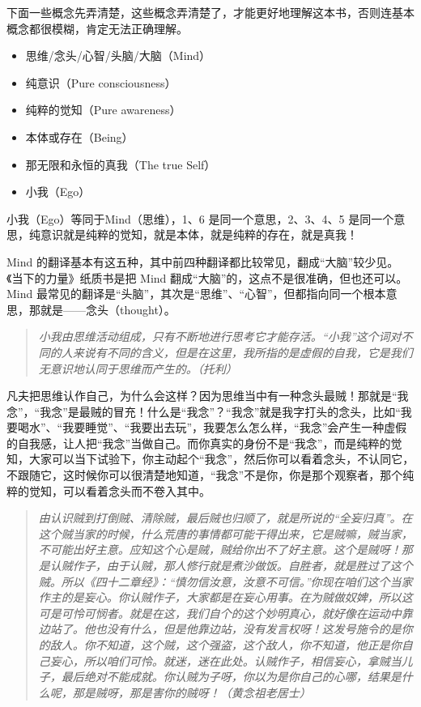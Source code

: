 下面一些概念先弄清楚，这些概念弄清楚了，才能更好地理解这本书，否则连基本概念都很模糊，肯定无法正确理解。

\begin{multicols}{2}
    \begin{itemize}
        \item 思维/念头/心智/头脑/大脑（Mind）
        \item 纯意识（Pure consciousness）
        \item 纯粹的觉知（Pure awareness）
        \item 本体或存在（Being）
        \item 那无限和永恒的真我（The true Self）
        \item 小我（Ego）
    \end{itemize}
\end{multicols}

小我（Ego）等同于Mind（思维），1、6 是同一个意思，2、3、4、5 是同一个意思，纯意识就是纯粹的觉知，就是本体，就是纯粹的存在，就是真我！

Mind 的翻译基本有这五种，其中前四种翻译都比较常见，翻成“大脑”较少见。《当下的力量》纸质书是把 Mind 翻成“大脑”的，这点不是很准确，但也还可以。Mind 最常见的翻译是“头脑”，其次是“思维”、“心智”，但都指向同一个根本意思，那就是——念头（thought）。

\begin{quote}\it
    小我由思维活动组成，只有不断地进行思考它才能存活。“小我”这个词对不同的人来说有不同的含义，但是在这里，我所指的是虚假的自我，它是我们无意识地认同于思维而产生的。（托利）
\end{quote}

凡夫把思维认作自己，为什么会这样？因为思维当中有一种念头最贼！那就是“我念”，“我念”是最贼的冒充！什么是“我念”？“我念”就是我字打头的念头，比如“我要喝水”、“我要睡觉”、“我要出去玩”，我要怎么怎么样，“我念”会产生一种虚假的自我感，让人把“我念”当做自己。而你真实的身份不是“我念”，而是纯粹的觉知，大家可以当下试验下，你主动起个“我念”，然后你可以看着念头，不认同它，不跟随它，这时候你可以很清楚地知道，“我念”不是你，你是那个观察者，那个纯粹的觉知，可以看着念头而不卷入其中。

\begin{quote}\it
    由认识贼到打倒贼、清除贼，最后贼也归顺了，就是所说的“全妄归真”。在这个贼当家的时候，什么荒唐的事情都可能干得出来，它是贼嘛，贼当家，不可能出好主意。应知这个心是贼，贼给你出不了好主意。这个是贼呀！那是认贼作子，由于认贼，那人修行就是煮沙做饭。自胜者，就是胜过了这个贼。所以《四十二章经》：“慎勿信汝意，汝意不可信。”你现在咱们这个当家作主的是妄心。你认贼作子，大家都是在妄心用事。在为贼做奴婢，所以这可是可怜可悯者。就是在这，我们自个的这个妙明真心，就好像在运动中靠边站了。他也没有什么，但是他靠边站，没有发言权呀！这发号施令的是你的敌人。你不知道，这个贼，这个强盗，这个敌人，你不知道，他正是你自己妄心，所以咱们可怜。就迷，迷在此处。认贼作子，相信妄心，拿贼当儿子，最后绝对不能成就。你认贼为子呀，你以为是你自己的心哪，结果是什么呢，那是贼呀，那是害你的贼呀！（黄念祖老居士）
\end{quote}

